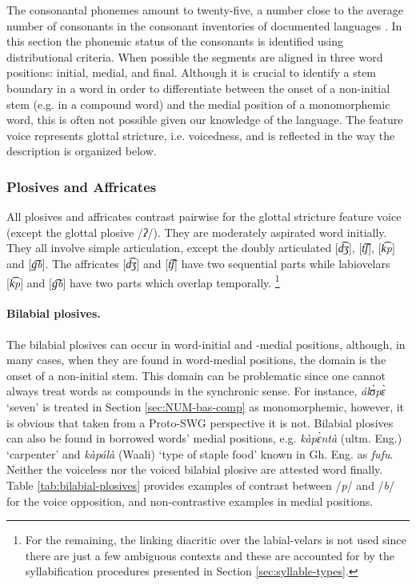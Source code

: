 The consonantal phonemes amount to twenty-five, a number close to the average
number of consonants in the consonant inventories of  documented  languages
\citep{Madd09}. In this section the phonemic status of the consonants is
identified using distributional criteria. When possible the segments are aligned
in three word positions:  initial, medial,  and final. Although it is crucial 
to
identify a stem boundary in a word in order to differentiate between the onset
of a non-initial stem (e.g. in a compound word) and the medial position of a
monomorphemic word,  this
  is often not possible given our knowledge of the language. The feature
{\sc voice} represents glottal stricture, i.e. voicedness, and is reflected in
the way  the description is organized below.

   
\subsubsection{Plosives and Affricates}

All plosives and affricates contrast pairwise for the glottal stricture feature 
{\sc voice} (except  the glottal plosive /{\it ʔ}/). They are moderately 
aspirated word initially. They all involve simple articulation, except  the 
doubly articulated [{\it  d͡ʒ}], [{\it t͡ʃ}], [{\it k͡p}] and [{\it g͡b}].  The 
affricates  [{\it  d͡ʒ}]  and [{\it t͡ʃ}] have two sequential parts while  
labiovelars  [{\it k͡p}] and [{\it g͡b}] have two parts which overlap 
temporally. \footnote{For the remaining,  the linking diacritic over the 
labial-velars is not used  since there are just a few ambiguous contexts and 
these are accounted for by the syllabification procedures presented in  Section 
\ref{sec:syllable-types}.}


\paragraph{Bilabial plosives.}

The bilabial plosives can occur in word-initial and -medial positions, although, 
in many  cases, when they are found in  word-medial positions, the domain  is 
the onset of a non-initial stem. This domain can be problematic since one cannot 
always treat words as compounds in the synchronic sense. For instance, {\it 
álʊ̀pɛ̀} `seven' is treated in Section \ref{sec:NUM-bas-comp} as   
monomorphemic, however,  it is obvious that taken from a Proto-SWG perspective 
it is not. Bilabial plosives  can also be  found in borrowed words' medial 
positions, e.g. {\it kàpɛ̀ntà} (ultm. Eng.) `carpenter' and {\it kàpálà} 
(Waali) `type of staple food'  known in Gh. Eng. as {\it fufu}.  Neither the 
voiceless nor the voiced bilabial plosive are attested word finally. Table 
\ref{tab:bilabial-plosives} provides examples of contrast between /{\it p}/ and 
/{\it b}/ for the {\sc voice} opposition, and non-contrastive examples  in 
medial positions.


